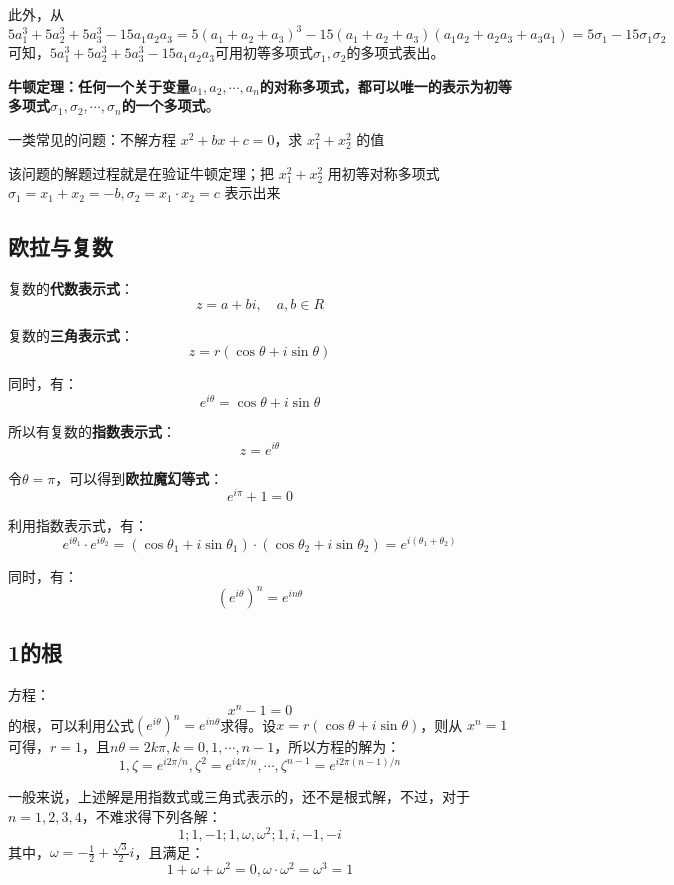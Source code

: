 \documentclass[12pt]{article}
\begin{document}
此外，从
$$5a_1^3 + 5a_2^3 + 5a_3^3 - 15a_1a_2a_3  = 5(a_1 + a_2 + a_3)^3 - 15(a_1+a_2+a_3)(a_1a_2 + a_2a_3 + a_3a_1) = 5\sigma_1 - 15\sigma_1\sigma_2$$  
可知，$5a_1^3 + 5a_2^3 + 5a_3^3 - 15a_1a_2a_3$可用初等多项式$\sigma_1, \sigma_2$的多项式表出。

\textbf{牛顿定理：任何一个关于变量$a_1, a_2, \cdots, a_n$的对称多项式，都可以唯一的表示为初等多项式$\sigma_1, \sigma_2, \cdots, \sigma_n$的一个多项式}。

\begin{framed}  
\small{
一类常见的问题：不解方程 $x^2 + bx + c = 0$，求 $x_1^2 + x_2^2$ 的值

该问题的解题过程就是在验证牛顿定理；把 $x_1^2 + x_2^2$ 用初等对称多项式$\sigma_1 = x_1 + x_2 = -b, \sigma_2 = x_1 \cdot x_2 = c$ 表示出来
}
\end{framed}

\subsection{欧拉与复数}
复数的\textbf{代数表示式}：
$$
z = a + bi, \quad a,b \in R
$$

复数的\textbf{三角表示式}：
$$
z = r(\cos\theta + i\sin\theta)
$$

同时，有：
$$
e^{i\theta} = \cos\theta + i\sin\theta
$$

所以有复数的\textbf{指数表示式}：
$$
z = e^{i\theta}
$$

令$\theta=\pi$，可以得到\textbf{欧拉魔幻等式}：
$$
e^{i\pi} + 1 = 0
$$

利用指数表示式，有：
$$
e^{i\theta_1} \cdot e^{i\theta_2} = (\cos\theta_1 + i\sin\theta_1)\cdot(\cos\theta_2 + i\sin\theta_2) = e^{i(\theta_1+\theta_2)}
$$

同时，有：
$$
(e^{i\theta})^n = e^{in\theta}
$$

\subsection{1的根}
方程：
$$
x^n - 1 = 0
$$
的根，可以利用公式$(e^{i\theta})^n = e^{in\theta}$求得。设$x = r(\cos\theta + i\sin\theta)$，则从 $x^n = 1$ 可得，$r = 1$，且$n\theta = 2k\pi, k = 0, 1, \cdots, n-1$，所以方程的解为：
$$
1, \zeta = e^{i2\pi/n},  \zeta^2 = e^{i4\pi/n}, \cdots,  \zeta^{n-1} = e^{i2\pi(n-1)/n}
$$

一般来说，上述解是用指数式或三角式表示的，还不是根式解，不过，对于$n=1,2,3,4$，不难求得下列各解：
$$
1; 1, -1; 1, \omega, \omega^2; 1, i, -1, -i
$$
其中，$\omega = -\frac{1}{2} + \frac{\sqrt{3}}{2}i$，且满足：
$$
1 + \omega + \omega^2 = 0, \omega \cdot \omega^2 = \omega^3 = 1
$$
\end{document}
